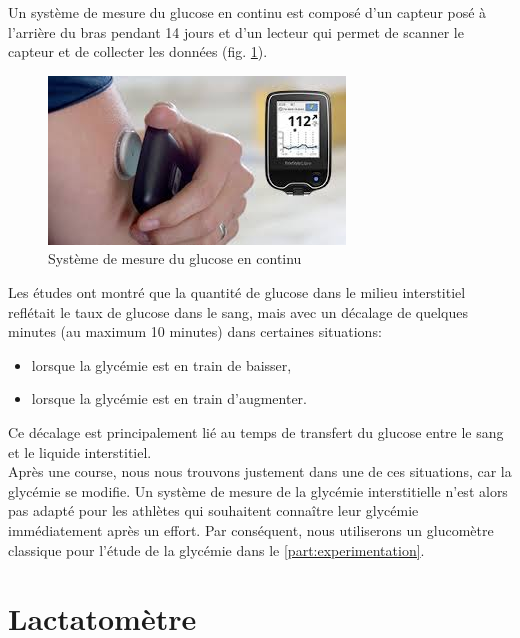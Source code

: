     
    Un système de mesure du glucose en continu est composé d’un capteur posé à l'arrière du bras pendant 14 jours et d'un lecteur qui permet de scanner le capteur et de collecter les données (fig. \ref{fig:systemeContinu}).
    
    \begin{figure}[H]
        \centering
        \includegraphics[scale=0.8]{images/glucometre2.jpg}
        \caption{\label{fig:systemeContinu}Système de mesure du glucose en continu}
    \end{figure}
    
    
    Les études ont montré que la quantité de glucose dans le milieu interstitiel reflétait le taux de glucose dans le sang, mais avec un décalage de quelques minutes (au maximum 10 minutes) dans certaines situations:
    \begin{itemize}
        \item lorsque la glycémie est en train de baisser,
        \item lorsque la glycémie est en train d'augmenter.\\
    \end{itemize}
    Ce décalage est principalement lié au temps de transfert du glucose entre le sang et le liquide interstitiel.\\
    
    Après une course, nous nous trouvons justement dans une de ces situations, car la glycémie se modifie. Un système de mesure de la glycémie interstitielle n'est alors pas adapté pour les athlètes qui souhaitent connaître leur glycémie immédiatement après un effort. Par conséquent, nous utiliserons un glucomètre classique pour l'étude de la glycémie dans le \autoref{part:experimentation}.
    
    
    \vspace{10pt}
    
    
    \section{Lactatomètre}
    
